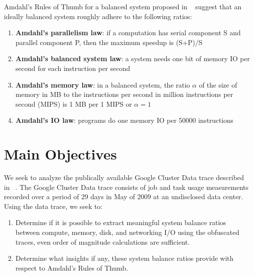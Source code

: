 \documentclass[a0,portrait]{a0poster}
\begin{document}
\begin{multicols}{2}
\noindent Amdahl's Rules of Thumb for a balanced system proposed in ~\cite{export:68636, Bell:2006:PCS:1110638.1110681} suggest that an ideally balanced system roughly adhere to the following ratios: \\
\begin{enumerate}
\item \textbf{Amdahl's parallelism law}: if a computation has serial component S and parallel component P, then the maximum speedup is (S+P)/S \\
\item \textbf{Amdahl's balanced system law}: a system needs one bit of memory IO per second for each instruction per second \\
\item \textbf{Amdahl's memory law}: in a balanced system, the ratio $\alpha$ of the size of memory in MB to the instructions per second in million instructions per second (MIPS) is 1 MB per 1 MIPS or $\alpha = 1$ \\
\item \textbf{Amdahl's IO law}: programs do one memory IO per 50000 instructions
\end{enumerate}


\color{DarkSlateGray} %

\section*{Main Objectives}

We seek to analyze the publically available Google Cluster Data trace described in ~\cite{clusterdata:Reiss2011}.
The Google Cluster Data trace consists of job and task usage measurements recorded over a period of 29 days in May of 2009 at an undisclosed data center. 
Using the data trace, we seek to:

\begin{enumerate}
\item[1] Determine if it is possible to extract meaningful system balance ratios between compute, memory, disk, and networking I/O using the obfuscated traces, even order of magnitude calculations are sufficient.
\item[2] Determine what insights if any, these system balance ratios provide with respect to Amdahl's Rules of Thumb.
\end{enumerate}


\end{multicols}
\end{document}
